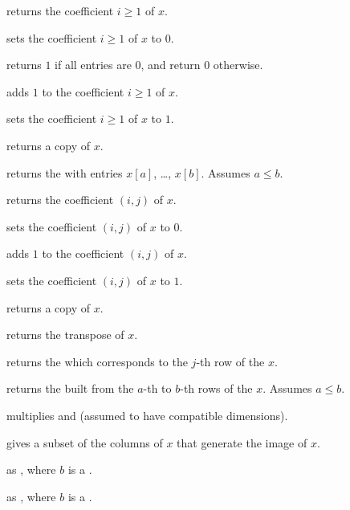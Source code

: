  returns the coefficient $i\ge 1$ of $x$.

 sets the coefficient $i\ge 1$ of $x$ to
$0$.

 returns $1$ if all entries are $0$, and return
$0$ otherwise.

 adds $1$ to the coefficient $i\ge 1$ of $x$.

 sets the coefficient $i\ge 1$ of $x$ to $1$.

 returns a copy of $x$.

 returns the  with
entries $x[a]$, \dots, $x[b]$. Assumes $a \leq b$.

 returns the coefficient $(i,j)$
of $x$.

 sets the coefficient $(i,j)$ of $x$
to $0$.

 adds $1$ to the coefficient $(i,j)$
of $x$.

 sets the coefficient $(i,j)$ of $x$
to $1$.

 returns a copy of $x$.

 returns the transpose of $x$.

 returns the  which corresponds
to the $j$-th row of the  $x$.

 returns the  built
from the $a$-th to $b$-th rows of the  $x$. Assumes $a \leq b$.

 multiplies   and  (assumed
to have compatible dimensions).

 gives a subset of the columns of $x$ that generate
the image of $x$.



as , where $b$ is a .

as , where $b$ is a .


